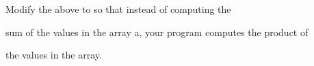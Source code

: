 Modify the above to so that instead of computing the

sum of the values in the array a, your program computes the product of

the values in the array.

